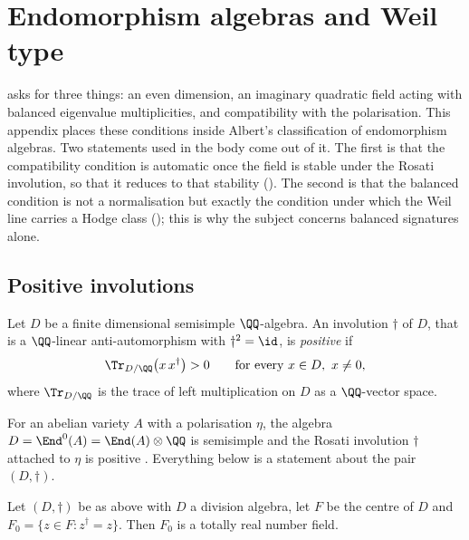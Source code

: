\section{Endomorphism algebras and Weil type}\label{app:albert}

 asks for three things: an even dimension, an imaginary
quadratic field acting with balanced eigenvalue multiplicities, and
compatibility with the polarisation. This appendix places these conditions
inside Albert's classification of endomorphism algebras. Two statements used
in the body come out of it. The first is that the compatibility condition is
automatic once the field is stable under the Rosati involution, so that it
reduces to that stability (). The second is that the
balanced condition is not a normalisation but exactly the condition under
which the Weil line carries a Hodge class (); this
is why the subject concerns balanced signatures alone.

\subsection{Positive involutions}

\begin{definition}\label{def:positive}
Let $D$ be a finite dimensional semisimple $\QQ$-algebra. An involution
$\dagger$ of $D$, that is a $\QQ$-linear anti-automorphism with
$\dagger^{2}=\id$, is \emph{positive} if
\[
  \Tr_{D/\QQ}\bigl(x\,x^{\dagger}\bigr)>0
  \qquad\text{for every }x\in D,\ x\ne0,
\]
where $\Tr_{D/\QQ}$ is the trace of left multiplication on $D$ as a
$\QQ$-vector space.
\end{definition}

For an abelian variety $A$ with a polarisation $\eta$, the algebra
$D=\End^{0}(A)=\End(A)\otimes\QQ$ is semisimple and the Rosati involution
$\dagger$ attached to $\eta$ is positive \cite[Ch.~5]{BL04}. Everything below
is a statement about the pair $(D,\dagger)$.

\begin{lemma}\label{lem:totallyreal}
Let $(D,\dagger)$ be as above with $D$ a division algebra, let $F$ be the
centre of $D$ and $F_{0}=\{z\in F:z^{\dagger}=z\}$. Then $F_{0}$ is a totally
real number field.
\end{lemma}

